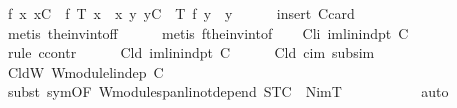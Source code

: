 \begin{isabellebody}
\ f{\isacharcolon}\ {\isachardoublequoteopen}{\isasymAnd}x{\isachardot}\ x{\isasymin}C\ {\isasymLongrightarrow}\ {\isacharquery}f\ {\isacharparenleft}T\ x{\isacharparenright}\ {\isacharequal}\ x{\isachardoublequoteclose}\ {\isachardoublequoteopen}{\isasymAnd}y{\isachardot}\ y{\isasymin}{\isacharquery}C{\isacharprime}\ {\isasymLongrightarrow}\ T\ {\isacharparenleft}{\isacharquery}f\ y{\isacharparenright}\ {\isacharequal}\ y{\isachardoublequoteclose}\isanewline
\ \ \ \ \isamarkupfalse%
\ {\isacharparenleft}insert\ C{\isacharprime}{\isacharunderscore}card{\isacharparenleft}{}{\isacharparenright}{\isacharparenright}\isanewline
\ \ \ \ \ \isamarkupfalse%
\ {\isacharparenleft}metis\ the{\isacharunderscore}inv{\isacharunderscore}into{\isacharunderscore}f{\isacharunderscore}f{\isacharparenright}\isanewline
\ \ \ \ \isamarkupfalse%
\ {\isacharparenleft}metis\ f{\isacharunderscore}the{\isacharunderscore}inv{\isacharunderscore}into{\isacharunderscore}f{\isacharparenright}\isanewline
\isanewline
\ \ \isamarkupfalse%
\ C{\isacharprime}{\isacharunderscore}li{\isacharcolon}\ {\isachardoublequoteopen}im{\isachardot}lin{\isacharunderscore}indpt\ {\isacharquery}C{\isacharprime}{\isachardoublequoteclose}\isanewline
\ \ \isamarkupfalse%
\ {\isacharparenleft}rule\ ccontr{\isacharparenright}\isanewline
\ \ \ \ \isamarkupfalse%
\ Cld{\isacharcolon}\ {\isachardoublequoteopen}{\isasymnot}im{\isachardot}lin{\isacharunderscore}indpt\ {\isacharquery}C{\isacharprime}{\isachardoublequoteclose}\isanewline
\ \ \ \ \isamarkupfalse%
\ Cld\ cim\ subs{\isacharunderscore}im\ \isamarkupfalse%
\ CldW{\isacharcolon}\ {\isachardoublequoteopen}W{\isachardot}module{\isachardot}lin{\isacharunderscore}dep\ {\isacharquery}C{\isacharprime}{\isachardoublequoteclose}\ \isanewline
\ \ \ \ \ \ \isamarkupfalse%
\ {\isacharparenleft}subst\ sym{\isacharbrackleft}OF\ W{\isachardot}module{\isachardot}span{\isacharunderscore}li{\isacharunderscore}not{\isacharunderscore}depend{\isacharparenleft}{}{\isacharparenright}{\isacharbrackleft}\ {\isacharquery}S{\isacharequal}{\isachardoublequoteopen}T{\isacharbackquote}C{\isachardoublequoteclose}\ \ {\isacharquery}N{\isacharequal}{\isachardoublequoteopen}imT{\isachardoublequoteclose}{\isacharbrackright}{\isacharbrackright}{\isacharparenright}\ \isanewline
\ \ \ \ \ \ \ \ \isamarkupfalse%
\ auto\isanewline
\ \ \ \ \isamarkupfalse%

\end{isabellebody}
